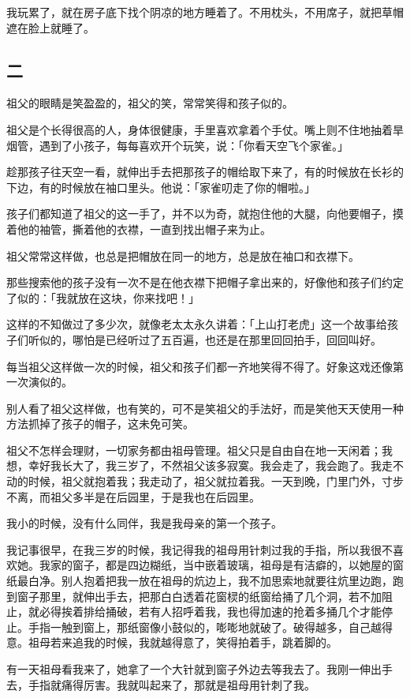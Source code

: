 \documentclass[UTF8]{ctexart}
\begin{document}
我玩累了，就在房子底下找个阴凉的地方睡着了。不用枕头，不用席子，就把草帽遮在脸上就睡了。

\subsection{二}

祖父的眼睛是笑盈盈的，祖父的笑，常常笑得和孩子似的。

祖父是个长得很高的人，身体很健康，手里喜欢拿着个手仗。嘴上则不住地抽着旱烟管，遇到了小孩子，每每喜欢开个玩笑，说：「你看天空飞个家雀。」

趁那孩子往天空一看，就伸出手去把那孩子的帽给取下来了，有的时候放在长衫的下边，有的时候放在袖口里头。他说：「家雀叨走了你的帽啦。」

孩子们都知道了祖父的这一手了，并不以为奇，就抱住他的大腿，向他要帽子，摸着他的袖管，撕着他的衣襟，一直到找出帽子来为止。

祖父常常这样做，也总是把帽放在同一的地方，总是放在袖口和衣襟下。

那些搜索他的孩子没有一次不是在他衣襟下把帽子拿出来的，好像他和孩子们约定了似的：「我就放在这块，你来找吧！」

这样的不知做过了多少次，就像老太太永久讲着：「上山打老虎」这一个故事给孩子们听似的，哪怕是已经听过了五百遍，也还是在那里回回拍手，回回叫好。

每当祖父这样做一次的时候，祖父和孩子们都一齐地笑得不得了。好象这戏还像第一次演似的。

别人看了祖父这样做，也有笑的，可不是笑祖父的手法好，而是笑他天天使用一种方法抓掉了孩子的帽子，这未免可笑。

祖父不怎样会理财，一切家务都由祖母管理。祖父只是自由自在地一天闲着；我想，幸好我长大了，我三岁了，不然祖父该多寂寞。我会走了，我会跑了。我走不动的时候，祖父就抱着我；我走动了，祖父就拉着我。一天到晚，门里门外，寸步不离，而祖父多半是在后园里，于是我也在后园里。

我小的时候，没有什么同伴，我是我母亲的第一个孩子。

我记事很早，在我三岁的时候，我记得我的祖母用针刺过我的手指，所以我很不喜欢她。我家的窗子，都是四边糊纸，当中嵌着玻璃，祖母是有洁癖的，以她屋的窗纸最白净。别人抱着把我一放在祖母的炕边上，我不加思索地就要往炕里边跑，跑到窗子那里，就伸出手去，把那白白透着花窗棂的纸窗给捅了几个洞，若不加阻止，就必得挨着排给捅破，若有人招呼着我，我也得加速的抢着多捅几个才能停止。手指一触到窗上，那纸窗像小鼓似的，嘭嘭地就破了。破得越多，自己越得意。祖母若来追我的时候，我就越得意了，笑得拍着手，跳着脚的。

有一天祖母看我来了，她拿了一个大针就到窗子外边去等我去了。我刚一伸出手去，手指就痛得厉害。我就叫起来了，那就是祖母用针刺了我。
\end{document}
